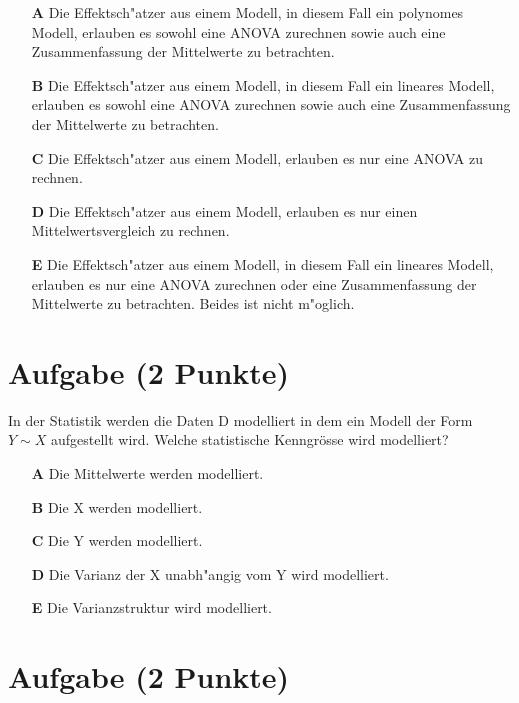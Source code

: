 \documentclass[a4paper, 10pt]{scrartcl}\usepackage[]{graphicx}\usepackage[]{xcolor}
\begin{document}
\begin{enumerate}
\item [\textbf{A} \msquare] Die Effektsch{"a}tzer aus einem Modell, in diesem Fall ein polynomes Modell, erlauben es sowohl eine ANOVA zurechnen sowie auch eine Zusammenfassung der Mittelwerte zu betrachten.
\item [\textbf{B} \msquare] Die Effektsch{"a}tzer aus einem Modell, in diesem Fall ein lineares Modell, erlauben es sowohl eine ANOVA zurechnen sowie auch eine Zusammenfassung der Mittelwerte zu betrachten.
\item [\textbf{C} \msquare] Die Effektsch{"a}tzer aus einem Modell, erlauben es nur eine ANOVA zu rechnen. 
\item [\textbf{D} \msquare] Die Effektsch{"a}tzer aus einem Modell, erlauben es nur einen Mittelwertsvergleich zu rechnen.
\item [\textbf{E} \msquare] Die Effektsch{"a}tzer aus einem Modell, in diesem Fall ein lineares Modell, erlauben es nur eine ANOVA zurechnen oder eine Zusammenfassung der Mittelwerte zu betrachten. Beides ist nicht m{"o}glich.
\end{enumerate}

\section{Aufgabe \hfill (2 Punkte)}

In der Statistik werden die Daten D modelliert in dem ein Modell der Form
$Y \sim X$ aufgestellt wird. Welche statistische Kenngr{\"o}sse wird modelliert? 



\begin{enumerate}
\item [\textbf{A} \msquare] Die Mittelwerte werden modelliert.
\item [\textbf{B} \msquare] Die X werden modelliert.
\item [\textbf{C} \msquare] Die Y werden modelliert.
\item [\textbf{D} \msquare] Die Varianz der X unabh{"a}ngig vom Y wird modelliert.
\item [\textbf{E} \msquare] Die Varianzstruktur wird modelliert.
\end{enumerate}

\section{Aufgabe \hfill (2 Punkte)}
\end{document}
